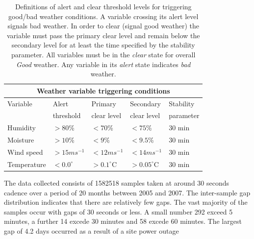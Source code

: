 \begin{table}[htbp]
\begin{center}
\begin{tabular}{lllll}
\toprule
\multicolumn{5}{c}{Weather variable triggering conditions} \\
\midrule
Variable    & Alert            & Primary          & Secondary         & Stability \\
            & threshold        & clear level      & clear level       & parameter\\

\midrule
Humidity    &  $> 80$\%        & $< 70$\%         & $< 75$\%          & 30 min\\
Moisture    &  $> 10$\%        & $< 9$\%          & $< 9.5$\%         & 30 min\\
Wind speed  &  $> 15ms^{-1}$   & $< 12ms^{-1}$    & $< 14ms^{-1}$     & 30 min\\
Temperature &  $< 0.0^{\circ}$ & $> 0.1^{\circ}$C & $> 0.05^{\circ}$C & 30 min\\
\bottomrule
\end{tabular}
\end{center}
\caption[Definitions of alert and clear threshold levels for triggering good/bad weather conditions.]
{Definitions of alert and clear threshold levels for triggering good/bad weather conditions. A variable crossing its alert level signals bad weather. In order to clear (signal good weather) the variable must pass the primary clear level and remain below the secondary level for at least the time specified by the stability parameter. All variables must be in the \emph{clear} state for overall \emph{Good} weather. Any variable in its \emph{alert} state indicates \emph{bad} weather.}
\label{tab:rcs_weather_rules}
\end{table}

The data collected consists of 1582518 samples taken at around 30 seconds cadence over a period of 20 months between 2005 and 2007. The inter-sample gap distribution indicates that there are relatively few gaps. The vast majority of the samples occur with gaps of 30 seconds or less. A small number 292 exceed 5 minutes, a further 14 excede 30 minutes and 58 excede 60 minutes. The largest gap of 4.2 days occurred as a result of a site power outage


